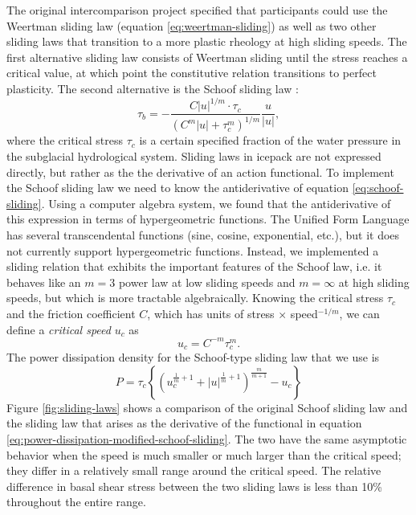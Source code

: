 \documentclass[journal abbreviation, manuscript]{copernicus}
\begin{document}
The original intercomparison project specified that participants could use the Weertman sliding law (equation \eqref{eq:weertman-sliding}) as well as two other sliding laws that transition to a more plastic rheology at high sliding speeds.
The first alternative sliding law consists of Weertman sliding until the stress reaches a critical value, at which point the constitutive relation transitions to perfect plasticity.
The second alternative is the Schoof sliding law \citep{schoof2005effect}:
\begin{equation}
    \tau_b = -\frac{C|u|^{1/m}\cdot \tau_c}{(C^m|u| + \tau_c^m)^{1/m}}\frac{u}{|u|},
    \label{eq:schoof-sliding}
\end{equation}
where the critical stress $\tau_c$ is a certain specified fraction of the water pressure in the subglacial hydrological system.
Sliding laws in icepack are not expressed directly, but rather as the the derivative of an action functional.
To implement the Schoof sliding law we need to know the antiderivative of equation \eqref{eq:schoof-sliding}.
Using a computer algebra system, we found that the antiderivative of this expression in terms of hypergeometric functions.
The Unified Form Language has several transcendental functions (sine, cosine, exponential, etc.), but it does not currently support hypergeometric functions.
Instead, we implemented a sliding relation that exhibits the important features of the Schoof law, i.e. it behaves like an $m = 3$ power law at low sliding speeds and $m = \infty$ at high sliding speeds, but which is more tractable algebraically.
Knowing the critical stress $\tau_c$ and the friction coefficient $C$, which has units of stress $\times$ speed${}^{-1/m}$, we can define a \emph{critical speed} $u_c$ as
\begin{equation}
    u_c = C^{-m}\tau_c^m.
\end{equation}
The power dissipation density for the Schoof-type sliding law that we use is
\begin{equation}
    P = \tau_c\left\{\left(u_c^{\frac{1}{m} + 1} + |u|^{\frac{1}{m} + 1}\right)^{\frac{m}{m + 1}} - u_c\right\}
    \label{eq:power-dissipation-modified-schoof-sliding}
\end{equation}
Figure \ref{fig:sliding-laws} shows a comparison of the original Schoof sliding law and the sliding law that arises as the derivative of the functional in equation \eqref{eq:power-dissipation-modified-schoof-sliding}.
The two have the same asymptotic behavior when the speed is much smaller or much larger than the critical speed; they differ in a relatively small range around the critical speed.
The relative difference in basal shear stress between the two sliding laws is less than 10\% throughout the entire range.
\end{document}
